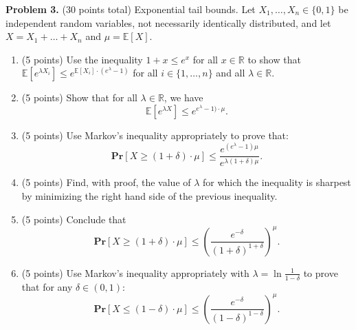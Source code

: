 \documentclass[11pt]{article}
\newcommand{\Ex}[1]{\ensuremath{\mathbb{E}\left[#1\right]}}
\newcommand{\PPr}[1]{\ensuremath{\mathbf{Pr}\left[#1\right]}}
\begin{document}
\vskip 0.2in\noindent
\textbf{Problem 3.} (30 points total)
Exponential tail bounds.
\vskip 0.1in\noindent
Let $X_1,\ldots,X_n\in\{0,1\}$ be independent random variables, not necessarily identically distributed, and let $X=X_1+\ldots+X_n$ and $\mu=\Ex{X}$. 
\begin{enumerate}
\item (5 points)
Use the inequality $1+x\le e^x$ for all $x\in\mathbb{R}$ to show that $\Ex{e^{\lambda X_i}}\le e^{\Ex{X_i}\cdot(e^\lambda-1)}$ for all $i\in\{1,\ldots,n\}$ and all $\lambda\in\mathbb{R}$. 
\item (5 points)
Show that for all $\lambda\in\mathbb{R}$, we have 
\[\Ex{e^{\lambda X}}\le e^{e^\lambda-1)\cdot\mu}.\]
\item (5 points)
Use Markov's inequality appropriately to prove that:
\[\PPr{X\ge(1+\delta)\cdot\mu}\le\frac{e^{(e^\lambda-1)\mu}}{e^{\lambda(1+\delta)\mu}}.\]
\item (5 points)
Find, with proof, the value of $\lambda$ for which the inequality is sharpest by minimizing the right hand side of the previous inequality. 
\item (5 points)
Conclude that
\[\PPr{X\ge(1+\delta)\cdot\mu}\le\left(\frac{e^{-\delta}}{(1+\delta)^{1+\delta}}\right)^\mu.\]
\item (5 points)
Use Markov's inequality appropriately with $\lambda=\ln\frac{1}{1-\delta}$ to prove that for any $\delta\in(0,1)$:
\[\PPr{X\le(1-\delta)\cdot\mu}\le\left(\frac{e^{-\delta}}{(1-\delta)^{1-\delta}}\right)^\mu.\]
\end{enumerate}
\end{document}
